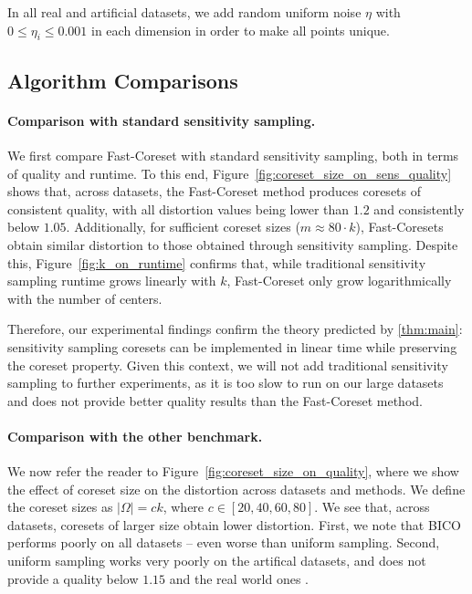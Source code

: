 In all real and artificial datasets, we add random uniform noise $\eta$ with $0 \leq \eta_i \leq 0.001$ in each dimension in order to make all points unique.

\subsection{Algorithm Comparisons}
\label{ssec:alg_qualities}

\paragraph*{Comparison with standard sensitivity sampling.}
We first compare Fast-Coreset with standard sensitivity sampling, both in terms of quality and runtime. 
To this end,
Figure~\ref{fig:coreset_size_on_sens_quality} shows that, across datasets, the Fast-Coreset method produces coresets of consistent quality, with all distortion
values being lower than $1.2$ and consistently below $1.05$. 
Additionally, for sufficient coreset sizes ($m \approx 80\cdot k$), Fast-Coresets obtain similar distortion to those obtained
through sensitivity sampling. 
Despite this, Figure~\ref{fig:k_on_runtime} confirms that, while traditional sensitivity sampling runtime grows linearly with $k$,
Fast-Coreset only grow logarithmically with the number of centers. 

 Therefore, our experimental findings confirm the theory predicted by \cref{thm:main}:
sensitivity sampling coresets can be implemented in linear time while preserving the coreset property. Given this context, we will not add traditional
sensitivity sampling to further experiments, as it is too slow to run on our large datasets and does not provide better quality results than the Fast-Coreset
method.

\paragraph*{Comparison with the other benchmark.}
We now refer the reader to Figure~\ref{fig:coreset_size_on_quality}, where we show the effect of coreset size on the distortion across datasets and methods.  We
define the coreset sizes as $|\Omega| = ck$, where $c \in [20, 40, 60, 80]$. We see that, across datasets, coresets of larger size obtain lower distortion.
First, we note that BICO performs poorly on all datasets -- even worse than uniform sampling. 
Second, uniform sampling works very poorly on the artifical datasets, and does not provide a quality below $1.15$ and the real world ones . 

